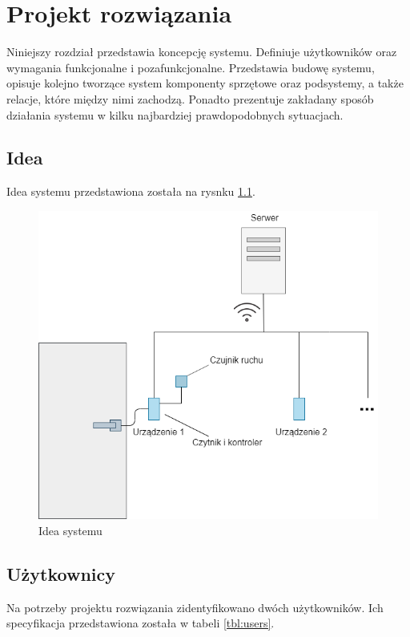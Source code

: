 \chapter{Projekt rozwiązania}
\label{chap:hl-arch}

    Niniejszy rozdział przedstawia koncepcję systemu. Definiuje użytkowników oraz wymagania funkcjonalne i pozafunkcjonalne. Przedstawia budowę systemu, opisuje kolejno tworzące system komponenty sprzętowe oraz podsystemy, a także relacje, które między nimi zachodzą. Ponadto prezentuje zakładany sposób działania systemu w kilku najbardziej prawdopodobnych sytuacjach.

    \section{Idea}
        Idea systemu przedstawiona została na rysnku \ref{fig:door}.

        \begin{figure}[h!]
            \begin{center}
                \includegraphics[width=.7\linewidth]{chapters/images/door2.png}
                \caption{Idea systemu}
                \label{fig:door}
            \end{center}
        \end{figure}

    \section{Użytkownicy}
        Na potrzeby projektu rozwiązania zidentyfikowano dwóch użytkowników. Ich specyfikacja przedstawiona została w tabeli \ref{tbl:users}.

